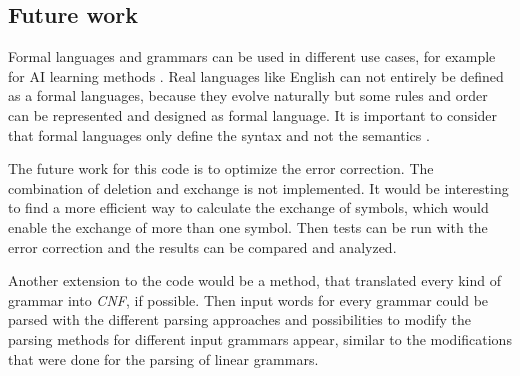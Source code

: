 \documentclass[a4paper, 11pt]{article}
\begin{document}
\subsection{Future work}

Formal languages and grammars can be used in different use cases, for example for AI learning methods \cite{delahaye1987formal, rosenschein1985formal}. Real languages like English can not entirely be defined as a formal languages, because they evolve naturally but some rules and order can be represented and designed as formal language. It is important to consider that formal languages only define the syntax and not the semantics \cite{FG}. 

The future work for this code is to optimize the error correction. The combination of deletion and exchange is not implemented. It would be interesting to find a more efficient way to calculate the exchange of symbols, which would enable the exchange of more than one symbol.
Then tests can be run with the error correction and the results can be compared and analyzed.

Another extension to the code would be a method, that translated every kind of grammar into \textit{CNF}, if possible. Then input words for every grammar could be parsed with the different parsing approaches and possibilities to modify the parsing methods for different input grammars appear, similar to the modifications that were done for the parsing of linear grammars.




\newpage











\newpage

\fancyhead[LO]{\empty}
\end{document}
